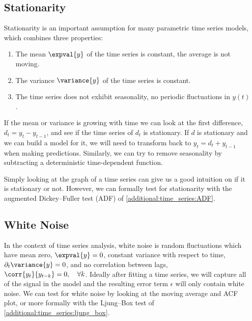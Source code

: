 
\subsection{Stationarity}
\label{additional:time_series:stationarity}

Stationarity is an important assumption for many parametric time series models,
which combines three properties:

\begin{enumerate}[noitemsep]
\item The mean $\expval{y}$ of the time series is constant, \ie the average is not moving.\label{item:time_series:stationarity:constant_mean}
\item The variance $\variance{y}$ of the time series is constant.\label{item:time_series:stationarity:constant_var}
\item The time series does not exhibit seasonality, \ie no periodic fluctuations in $y\left(t\right)$.
\label{item:time_series:stationarity:seasonality}
\end{enumerate}

If the mean or variance is growing with time
we can look at the first difference, $d_{t} = y_{t} -y_{t-1}$,
and see if the time series of $d_{t}$ is stationary.
If $d$ is stationary and we can build a model for it, we will
need to transform back to $y_{t} = d_{t} + y_{t-1}$ when making predictions.
Similarly, we can try to remove seasonality
by subtracting a deterministic time-dependent function.

Simply looking at the graph of a time series can give us
a good intuition on if it is stationary or not.
However, we can formally test for stationarity
with the augmented Dickey--Fuller test (ADF) of \cref{additional:time_series:ADF}.

\subsection{White Noise}
\label{additional:time_series:white_noise}

In the context of time series analysis, white noise is random fluctuations which
have mean zero, $\expval{y} = 0$,
constant variance with respect to time, $\partial_{t} \variance{y} = 0$,
and no correlation between lags, $\corr{y_{t}}{y_{t-k}} = 0,\quad \forall k$.
Ideally after fitting a time series, we will capture all of the signal
in the model and the resulting error term $\epsilon$ will only contain white noise.
We can test for white noise by looking at the moving average and ACF plot,
or more formally with the Ljung--Box test of \cref{additional:time_series:ljung_box}.

